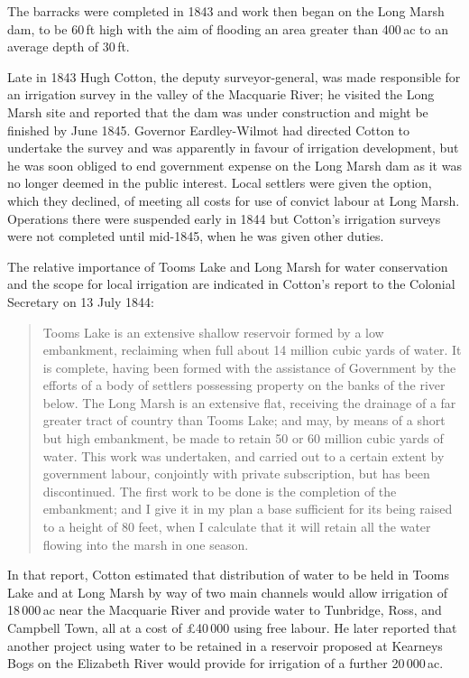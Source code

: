 The barracks were completed in 1843 and work then began on the Long
Marsh dam, to be 60\,ft high with the aim of flooding an area greater
than 400\,ac to an average depth of
30\,ft.

Late in 1843 Hugh Cotton, the deputy surveyor-general, was made
responsible for an irrigation survey in the valley of the Macquarie
River; he visited the Long Marsh site and reported that the dam was
under construction and might be finished by June 1845.  Governor
Eardley-Wilmot had directed Cotton to undertake the survey and was
apparently in favour of irrigation development, but he was soon
obliged to end government expense on the Long Marsh dam as it was no
longer deemed in the public interest.  Local settlers were given the
option, which they declined, of meeting all costs for use of convict
labour at Long Marsh.  Operations there were suspended early in 1844
but Cotton's irrigation surveys were not completed until mid-1845,
when he was given other duties.

The relative importance of Tooms Lake and Long Marsh for water
conservation and the scope for local irrigation are indicated in
Cotton's report to the Colonial Secretary on 13 July 1844:
\begin{quote}
	Tooms Lake is an extensive shallow reservoir formed by a low
	embankment, reclaiming when full about 14 million cubic yards
	of water.  It is complete, having been formed with the
	assistance of Government by the efforts of a body of settlers
	possessing property on the banks of the river below.  The Long
	Marsh is an extensive flat, receiving the drainage of a far
	greater tract of country than Tooms Lake; and may, by means of
	a short but high embankment, be made to retain 50 or 60
	million cubic yards of water. This work was undertaken, and
	carried out to a certain extent by government labour,
	conjointly with private subscription, but has been
	discontinued.  The first work to be done is the completion of
	the embankment; and I give it in my plan a base sufficient for
	its being raised to a height of 80 feet, when I calculate that
	it will retain all the water flowing into the marsh in one
	season.
\end{quote}

In that report, Cotton estimated that distribution of water to be held
in Tooms Lake and at Long Marsh by way of two main channels would
allow irrigation of 18\,000\,ac near the Macquarie River and provide
water to Tunbridge, Ross, and Campbell Town, all at a cost of
\pounds40\,000 using free labour.  He later reported that another project
using water to be retained in a reservoir proposed at Kearneys Bogs on
the Elizabeth River would provide for irrigation of a further
20\,000\,ac.

